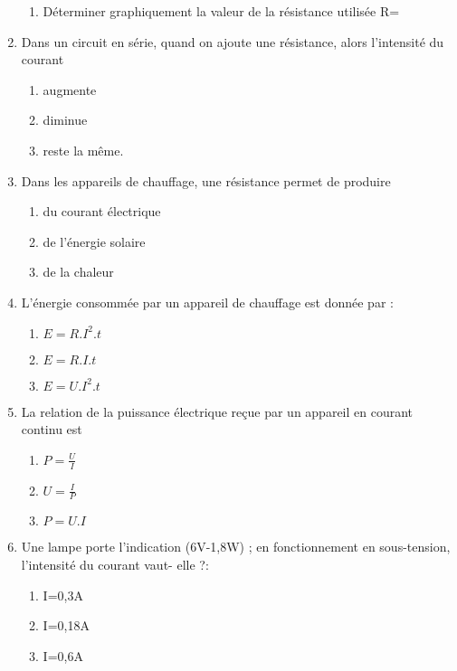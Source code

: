 \documentclass[12pt]{article}
\begin{document}
\begin{multicols}{2}
\begin{enumerate}
\begin{enumerate}
	\item Déterminer graphiquement la valeur de la résistance utilisée R=\dotfill
\end{enumerate}
\item Dans un circuit en série, quand on ajoute une résistance, alors l'intensité du courant
	\begin{enumerate}
		\item augmente
		\item diminue
		\item reste la même.
	\end{enumerate}
\item Dans les appareils de chauffage, une résistance permet de produire 
	\begin{enumerate}
		\item du courant électrique
		\item de l'énergie solaire
		\item de la chaleur
	\end{enumerate}
\item L’énergie consommée par un appareil de chauffage est donnée par :
	\begin{enumerate}
		\item $E=R.I^2.t$
		\item $E=R.I.t$
		\item $E=U.I^2.t$
	\end{enumerate}
\item La relation de la puissance électrique reçue par un appareil en courant continu est
	\begin{enumerate}
		\item $P=\frac{U}{I}$
		\item $U=\frac{I}{P}$
		\item $P=U.I$
	\end{enumerate}
\item Une lampe porte l’indication (6V-1,8W) ; en fonctionnement en sous-tension, l’intensité du
courant vaut- elle ?:
\begin{enumerate}
	\item I=0,3A
	\item I=0,18A
	\item I=0,6A
\end{enumerate}


	\end{enumerate}
\end{multicols}	
\end{document}
